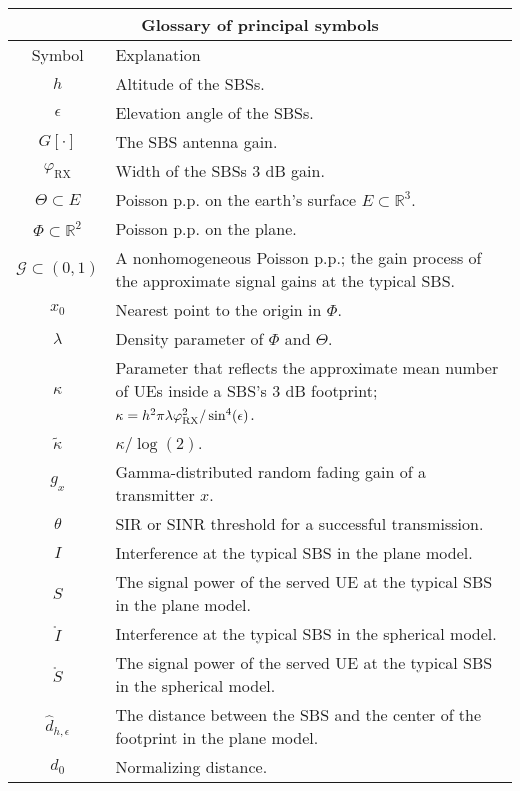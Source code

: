\documentclass[conference]{IEEEtran}
\newcommand{\R}{\mathbb{R}}
\theoremstyle{definition}
\theoremstyle{plain}
\begin{document}
         \begin{table}
           \begin{center}
             \begin{tabular}{| c | p{7cm}  |}
               \hline
               \multicolumn{2}{|c|}{Glossary of principal symbols} \\
               \hline
               Symbol& Explanation 
               \\ 
               \hline
               $h$ & Altitude of the SBSs. \\
               $\epsilon$ & Elevation angle of the SBSs. \\
               $G[\cdot]$ & The SBS antenna gain.\\
               $\varphi_{\text{RX}}$ & Width of the SBSs $3$ dB gain. \\
               $\Theta \subset E $ & Poisson p.p. on the earth's surface $E \subset \R^3$. \\
               $\Phi \subset \R^2$ & Poisson p.p. on the plane. \\
               $\mathcal{G} \subset (0,1)$ & A nonhomogeneous Poisson p.p.; the gain process of the approximate signal gains at the typical SBS.  \\
               $x_0$ & Nearest point to the origin in $\Phi$.  \\
               $\lambda$ & Density parameter of $\Phi$ and $\Theta$. \\
               $\kappa$ & Parameter that reflects the approximate mean number of UEs inside a SBS's $3$ dB footprint;  $\kappa = h^2\pi \lambda \varphi_{\textup{RX}}^2/\sin^4(\epsilon)$. \\
               ${\tilde{\kappa}}$ &  $\kappa/\log(2)$.\\
               $g_x$ &   Gamma-distributed random fading gain of a transmitter $x$.     \\
               $\theta$ & SIR or SINR threshold for a successful transmission.\\
               $I$ & Interference at the typical SBS in the plane model.\\
               $S$ & The signal power of the served UE at the typical SBS in the plane model.\\
               $\mathring{I}$ & Interference at the typical SBS in the spherical model.\\
               $\mathring{S}$ & The signal power of the served UE at the typical SBS in the spherical model.\\ 
               $\hat{d}_{h,\epsilon}$ & The distance between the SBS and the center of the footprint in the plane model.\\
               $d_{0}$ & Normalizing distance.  \\                        
               \hline
             \end{tabular}
           \end{center}
         \end{table}   
\end{document}
